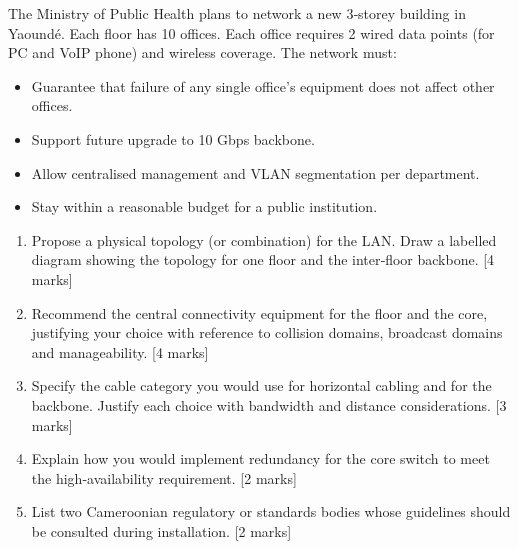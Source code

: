 \documentclass[11pt]{article}
\begin{document}
\begin{exercice}
The Ministry of Public Health plans to network a new 3‑storey building in Yaoundé. Each floor has 10 offices. Each office requires 2 wired data points (for PC and VoIP phone) and wireless coverage. The network must:
\begin{itemize}
\item Guarantee that failure of any single office's equipment does not affect other offices.
\item Support future upgrade to 10 Gbps backbone.
\item Allow centralised management and VLAN segmentation per department.
\item Stay within a reasonable budget for a public institution.
\end{itemize}
\begin{enumerate}
\item Propose a physical topology (or combination) for the LAN. Draw a labelled diagram showing the topology for one floor and the inter‑floor backbone. [4 marks]
\item Recommend the central connectivity equipment for the floor and the core, justifying your choice with reference to collision domains, broadcast domains and manageability. [4 marks]
\item Specify the cable category you would use for horizontal cabling and for the backbone. Justify each choice with bandwidth and distance considerations. [3 marks]
\item Explain how you would implement redundancy for the core switch to meet the high‑availability requirement. [2 marks]
\item List two Cameroonian regulatory or standards bodies whose guidelines should be consulted during installation. [2 marks]
\end{enumerate}
\end{exercice}
\end{document}
